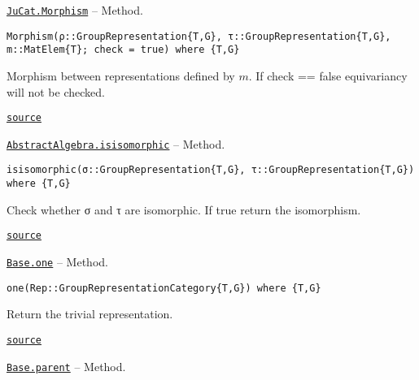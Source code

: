 \documentclass{memoir}
\begin{document}
\hypertarget{17107855014913617445}{} 
\hyperlink{17107855014913617445}{\texttt{JuCat.Morphism}}  -- {Method.}

\begin{adjustwidth}{2em}{0pt}


\begin{verbatim}
Morphism(ρ::GroupRepresentation{T,G}, τ::GroupRepresentation{T,G}, m::MatElem{T}; check = true) where {T,G}
\end{verbatim}

Morphism between representations defined by \(m\). If check == false equivariancy will not be checked.



\href{https://github.com/FabianMaeurer/JuCat.jl/blob/367390e2d003deec2ababa73caeab405e934bb35/src/structures/Representations/GroupRepresentations.jl#L63-L68}{\texttt{source}}


\end{adjustwidth}
\hypertarget{7064680413999145372}{} 
\hyperlink{7064680413999145372}{\texttt{AbstractAlgebra.isisomorphic}}  -- {Method.}

\begin{adjustwidth}{2em}{0pt}


\begin{verbatim}
isisomorphic(σ::GroupRepresentation{T,G}, τ::GroupRepresentation{T,G}) where {T,G}
\end{verbatim}

Check whether σ and τ are isomorphic. If true return the isomorphism.



\href{https://github.com/FabianMaeurer/JuCat.jl/blob/367390e2d003deec2ababa73caeab405e934bb35/src/structures/Representations/GroupRepresentations.jl#L161-L165}{\texttt{source}}


\end{adjustwidth}
\hypertarget{4849929255757053512}{} 
\hyperlink{4849929255757053512}{\texttt{Base.one}}  -- {Method.}

\begin{adjustwidth}{2em}{0pt}


\begin{verbatim}
one(Rep::GroupRepresentationCategory{T,G}) where {T,G}
\end{verbatim}

Return the trivial representation.



\href{https://github.com/FabianMaeurer/JuCat.jl/blob/367390e2d003deec2ababa73caeab405e934bb35/src/structures/Representations/GroupRepresentations.jl#L120-L124}{\texttt{source}}


\end{adjustwidth}
\hypertarget{1444146782523177002}{} 
\hyperlink{1444146782523177002}{\texttt{Base.parent}}  -- {Method.}
\end{document}
